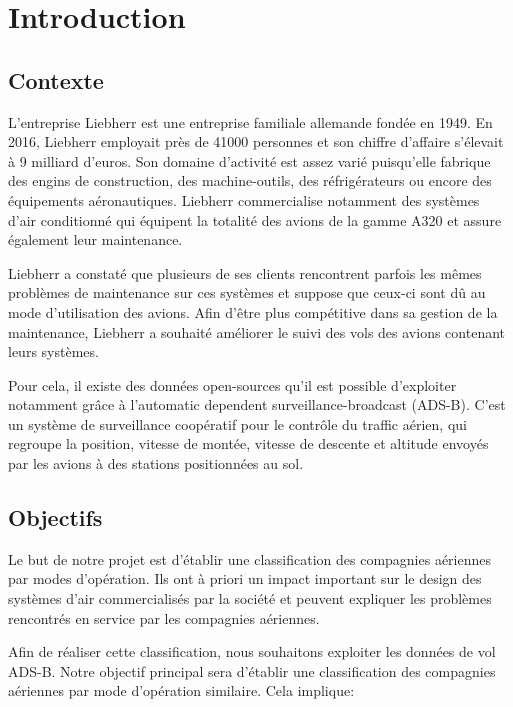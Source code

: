 \chapter*{Introduction}
\label{chap:introduction}

\section*{Contexte}

L'entreprise Liebherr est une entreprise familiale allemande fondée en 1949. En 2016, Liebherr employait près de 41000 personnes et son chiffre d'affaire s'élevait à 9 milliard d'euros. Son domaine d'activité est assez varié puisqu'elle fabrique des engins de construction, des machine-outils, des réfrigérateurs ou encore des équipements aéronautiques. Liebherr commercialise notamment des systèmes d'air conditionné qui équipent la totalité des avions de la gamme A320 et assure également leur maintenance.

Liebherr a constaté que plusieurs de ses clients rencontrent parfois les mêmes problèmes de maintenance sur ces systèmes et suppose que ceux-ci sont dû au mode d'utilisation des avions. Afin d'être plus compétitive dans sa gestion de la maintenance, Liebherr a souhaité améliorer le suivi des vols des avions contenant leurs systèmes. 

Pour cela, il existe des données open-sources qu'il est possible d'exploiter notamment grâce à l'automatic dependent surveillance-broadcast (ADS-B). C'est un système de surveillance coopératif pour le contrôle du traffic aérien, qui regroupe la position, vitesse de montée, vitesse de descente et altitude envoyés par les avions à des stations positionnées au sol.

\section*{Objectifs}

Le but de notre projet est d'établir une classification des compagnies aériennes par modes d'opération. Ils ont à priori un impact important sur le design des systèmes d'air commercialisés par la société et peuvent expliquer les problèmes rencontrés en service par les compagnies aériennes.

Afin de réaliser cette classification, nous souhaitons exploiter les données de vol ADS-B. Notre objectif principal sera d'établir une classification des compagnies aériennes par mode d'opération similaire. Cela implique:


